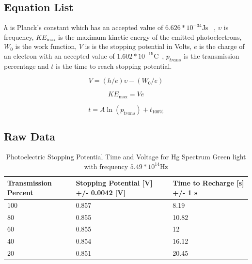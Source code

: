 \documentclass[]{article}
\newcommand{\hVal}{ $6.626 * 10^{-34}\si{\joule\second}$ }
\newcommand{\greenFreq}{$5.49 * 10^{14}$}
\begin{document}
\subsection{Equation List} 
$h$ is Planck's constant which has an accepted value of \hVal~\cite{ref:h}, $\upsilon$ is frequency, $KE_{\max}$ is the
maximum kinetic energy of the emitted photoelectrons, $W_{0}$ is the work
function, $V$ is is the stopping potential in Volts, $e$ is the charge of an
electron with an accepted value of $1.602 * 10^{-19}
\si{\coulomb}$~\cite{ref:e}, $p_{trans}$ is the transmission percentage and $t$
is the time to reach stopping potential.


\begin{equation}\label{eq:linear_einstein}
    V = (h/e)\upsilon - (W_{0}/e)
\end{equation}

\begin{equation}\label{eq:potential}
    KE_{\max} = Ve
\end{equation}

\begin{equation}\label{eq:transmission_linear}
    t = A\ln(p_{trans}) + t_{100\%}
\end{equation}

\subsection{Raw Data}

\begin{table}[H]
    \caption{Photoelectric Stopping Potential Time and Voltage for Hg Spectrum Green light
    with frequency \greenFreq$\si{\hertz}$}\label{tab:green}
    \begin{tabular}{@{}lll@{}}
        \toprule
        Transmission Percent & Stopping Potential {[}V{]} +/- 0.0042 {[}V{]} & Time to Recharge {[}s{]} +/- 1  s \\ \midrule
        100                 & 0.857                                         & 8.19                              \\
        80                  & 0.855                                         & 10.82                             \\
        60                  & 0.855                                         & 12                                \\
        40                  & 0.854                                         & 16.12                             \\
        20                  & 0.851                                         & 20.45                             \\ \bottomrule
    \end{tabular}
\end{table}
\end{document}
